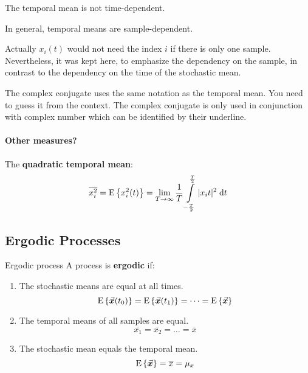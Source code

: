 \begin{refsection}
The temporal mean is not time-dependent.

\begin{fact}
	In general, temporal means are sample-dependent.
\end{fact}

Actually $x_i(t)$ would not need the index $i$ if there is only one sample. Nevertheless, it was kept here, to emphasize the dependency on the sample, in contrast to the dependency on the time of the stochastic mean.

\begin{attention}
	The complex conjugate uses the same notation as the temporal mean. You need to guess it from the context. The complex conjugate is only used in conjunction with complex number which can be identified by their underline.
\end{attention}

\paragraph{Other measures?}

The  \textbf{quadratic temporal mean}:
\begin{equation}
	\overline{x^2_i} = \mathrm{E}\left\{x^2_i(t)\right\} = \lim\limits_{T \rightarrow \infty} \frac{1}{T} \int\limits_{-\frac{T}{2}}^{\frac{T}{2}} |x_i{t}|^2 \; \mathrm{d} t
\end{equation}

\subsection{Ergodic Processes}

\begin{definition}{Ergodic process}
	 A process is \textbf{ergodic} if:
	\begin{enumerate}
		\item The stochastic means are equal at all times.
		\begin{equation}
			\mathrm{E}\left\{\vec{\bm{x}}(t_0)\right\} = \mathrm{E}\left\{\vec{\bm{x}}(t_1)\right\} = \dots = \mathrm{E}\left\{\vec{\bm{x}}\right\}
		\end{equation}
		\item The temporal means of all samples are equal.
		\begin{equation}
			\overline{x_1} = \overline{x_2} = \dots = \overline{x}
		\end{equation}
		\item The stochastic mean equals the temporal mean.
		\begin{equation}
			\mathrm{E}\left\{\vec{\bm{x}}\right\} = \overline{x} = \mu_x
		\end{equation}
	\end{enumerate}
\end{definition}


\end{refsection}
